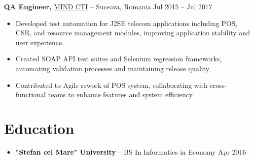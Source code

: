 \documentclass[11pt]{article}       %
\begin{document}
\textbf{QA Engineer,} \href{https://mindcti.com/}{MIND CTI} -- Suceava, Romania \hfill Jul 2015 – Jul 2017
\vspace{-9pt}

\begin{itemize}
    \item Developed test automation for J2SE telecom applications including POS, CSR, and resource management modules, improving application stability and user experience.
    \item Created SOAP API test suites and Selenium regression frameworks, automating validation processes and maintaining release quality.
    \item Contributed to Agile rework of POS system, collaborating with cross-functional teams to enhance features and system efficiency.
\end{itemize}

\vspace{-18.5pt}

\section*{Education}
\begin{itemize}
    \item \textbf{"Stefan cel Mare" University} -- BS In Informatics in Economy \hfill Apr 2016
\end{itemize}
\end{document}
